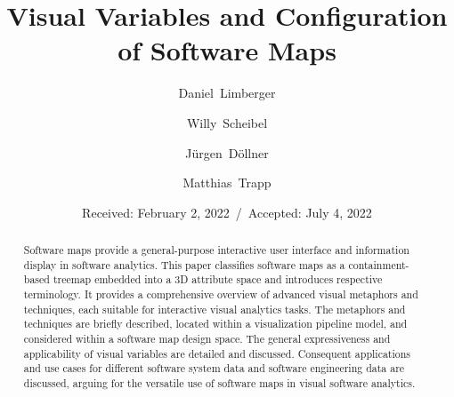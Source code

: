 \documentclass{svjour3}                     %
\begin{document}
\title{Visual Variables and Configuration of Software Maps}


\author{Daniel~Limberger \and
		Willy~Scheibel \and
		J{\"u}rgen~D{\"o}llner \and
		Matthias~Trapp
}



\date{Received: February 2, 2022~/~Accepted: July 4, 2022}

\maketitle

\begin{abstract}
    Software maps provide a general-purpose interactive user interface and information display in software analytics.
    This paper classifies software maps as a containment-based treemap embedded into a 3D attribute space and introduces respective terminology.
    It provides a comprehensive overview of advanced visual metaphors and techniques, each suitable for interactive visual analytics tasks.
    The metaphors and techniques are briefly described, located within a visualization pipeline model, and considered within a software map design space.
    The general expressiveness and applicability of visual variables are detailed and discussed.
    Consequent applications and use cases for different software system data and software engineering data are discussed, arguing for the versatile use of software maps in visual software analytics.
\end{abstract}
\end{document}
